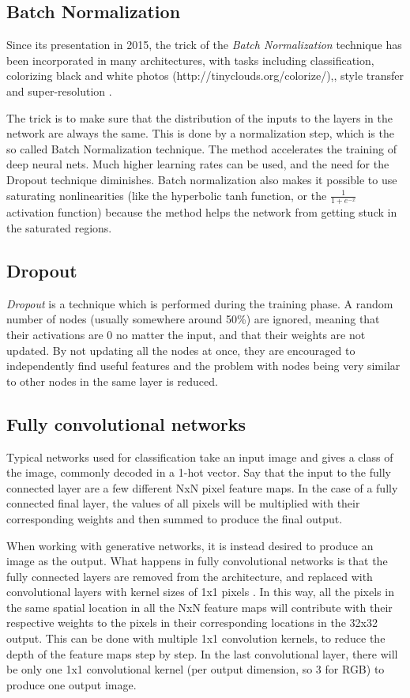 \subsection{Batch Normalization}
Since its presentation in 2015, the trick of the \emph{Batch Normalization} technique \citep{Batchnorm} has been incorporated in many architectures, with tasks including classification, colorizing black and white photos (http://tinyclouds.org/colorize/),\citep{Colorful-colorization}, style transfer \citep{Perceptual-losses} and super-resolution \citep{Perceptual-losses}. 

The trick is to make sure that the distribution of the inputs to the layers in the network are always the same. This is done by a normalization step, which is the so called Batch Normalization technique. The method accelerates the training of deep neural nets. Much higher learning rates can be used, and the need for the Dropout technique diminishes. Batch normalization also makes it possible to use saturating nonlinearities (like the hyperbolic tanh function, or the $\frac{1}{1 + e^{-x}}$ activation function) because the method helps the network from getting stuck in the saturated regions. 

\subsection{Dropout}
\emph{Dropout} \citep{Dropout} is a technique which is performed during the training phase. A random number of nodes (usually somewhere around 50\%) are ignored, meaning that their activations are 0 no matter the input, and that their weights are not updated. By not updating all the nodes at once, they are encouraged to independently find useful features and the problem with nodes being very similar to other nodes in the same layer is reduced. 

\subsection{Fully convolutional networks}
Typical networks used for classification take an input image and gives a class of the image, commonly decoded in a 1-hot vector. Say that the input to the fully connected layer are a few different NxN pixel feature maps. In the case of a fully connected final layer, the values of all pixels will be multiplied with their corresponding weights and then summed to produce the final output. 

When working with generative networks, it is instead desired to produce an image as the output. What happens in fully convolutional networks is that the fully connected layers are removed from the architecture, and replaced with convolutional layers with kernel sizes of 1x1 pixels \citep{Fully-convolutional}. In this way, all the pixels in the same spatial location in all the NxN feature maps will contribute with their respective weights to the pixels in their corresponding locations in the 32x32 output. This can be done with multiple 1x1 convolution kernels, to reduce the depth of the feature maps step by step. In the last convolutional layer, there will be only one 1x1 convolutional kernel (per output dimension, so 3 for RGB) to produce one output image. 

